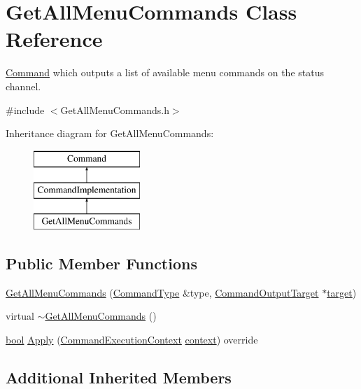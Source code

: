 \hypertarget{class_get_all_menu_commands}{}\section{Get\+All\+Menu\+Commands Class Reference}
\label{class_get_all_menu_commands}


\hyperlink{class_command}{Command} which outputs a list of available menu commands on the status channel.  




{\ttfamily \#include $<$Get\+All\+Menu\+Commands.\+h$>$}

Inheritance diagram for Get\+All\+Menu\+Commands\+:\begin{figure}[H]
\begin{center}
\leavevmode
\includegraphics[height=3.000000cm]{class_get_all_menu_commands}
\end{center}
\end{figure}
\subsection*{Public Member Functions}
\begin{DoxyCompactItemize}
\item 
\hyperlink{class_get_all_menu_commands_a7cffb1f0028a5b3ab460a20a643e8ec0}{Get\+All\+Menu\+Commands} (\hyperlink{class_command_type}{Command\+Type} \&type, \hyperlink{class_command_output_target}{Command\+Output\+Target} $\ast$\hyperlink{lib_2expat_8h_a15a257516a87decb971420e718853137}{target})
\item 
virtual \hyperlink{class_get_all_menu_commands_a6862603978dce19de2e2b05c1a686570}{$\sim$\+Get\+All\+Menu\+Commands} ()
\item 
\hyperlink{mac_2config_2i386_2lib-src_2libsoxr_2soxr-config_8h_abb452686968e48b67397da5f97445f5b}{bool} \hyperlink{class_get_all_menu_commands_a2458c2850d3df6051a74e09dccf0bb14}{Apply} (\hyperlink{class_command_execution_context}{Command\+Execution\+Context} \hyperlink{structcontext}{context}) override
\end{DoxyCompactItemize}
\subsection*{Additional Inherited Members}


